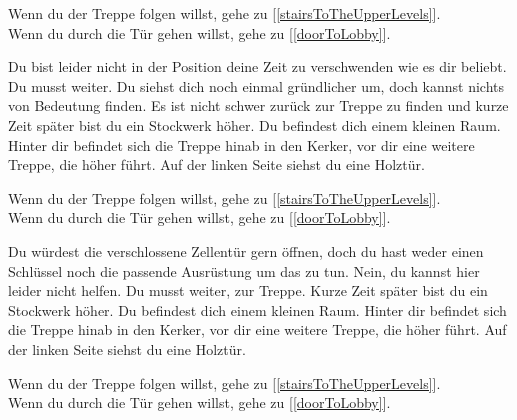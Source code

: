 Wenn du der Treppe folgen willst, gehe zu [\ref{stairsToTheUpperLevels}].
\\Wenn du durch die Tür gehen willst, gehe zu [\ref{doorToLobby}].


Du bist leider nicht in der Position deine Zeit zu verschwenden wie es dir beliebt. Du musst weiter. Du siehst dich noch einmal gründlicher um, doch kannst nichts von Bedeutung finden. Es ist nicht schwer zurück zur Treppe zu finden und kurze Zeit später bist du ein Stockwerk höher. Du befindest dich einem kleinen Raum. Hinter dir befindet sich die Treppe hinab in den Kerker, vor dir eine weitere Treppe, die höher führt. Auf der linken Seite siehst du eine Holztür.

Wenn du der Treppe folgen willst, gehe zu [\ref{stairsToTheUpperLevels}].
\\Wenn du durch die Tür gehen willst, gehe zu [\ref{doorToLobby}].


Du würdest die verschlossene Zellentür gern öffnen, doch du hast weder einen Schlüssel noch die passende Ausrüstung um das zu tun. Nein, du kannst hier leider nicht helfen. Du musst weiter, zur Treppe. Kurze Zeit später bist du ein Stockwerk höher. Du befindest dich einem kleinen Raum. Hinter dir befindet sich die Treppe hinab in den Kerker, vor dir eine weitere Treppe, die höher führt. Auf der linken Seite siehst du eine Holztür.

Wenn du der Treppe folgen willst, gehe zu [\ref{stairsToTheUpperLevels}].
\\Wenn du durch die Tür gehen willst, gehe zu [\ref{doorToLobby}].
